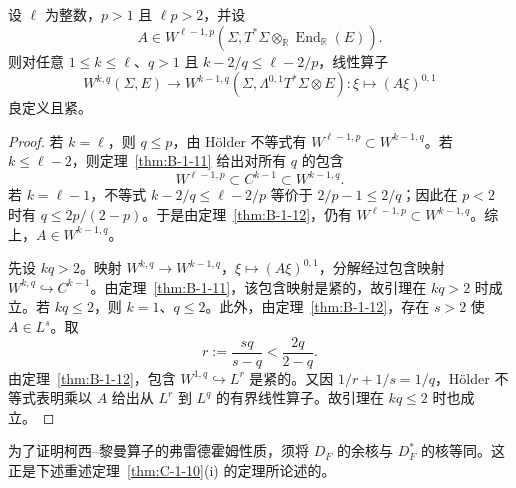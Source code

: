\begin{lemma}\label{lem:C-2-2}
设 $\ell$ 为整数，$p>1$ 且 $\ell p>2$，并设
\[
  A\in W^{\ell-1,p}(\Sigma,T^*\Sigma\otimes_{\mathbb R}\operatorname{End}_{\mathbb R}(E)).
\]
则对任意 $1\le k\le\ell$、$q>1$ 且 $k-2/q\le\ell-2/p$，线性算子
\[
  W^{k,q}(\Sigma,E)\longrightarrow
  W^{k-1,q}(\Sigma,\Lambda^{0,1}T^*\Sigma\otimes E):
  \xi\longmapsto(A\xi)^{0,1}
\]
良定义且紧。
\end{lemma}
\begin{proof}
若 $k=\ell$，则 $q\le p$，由 Hölder 不等式有 $W^{\ell-1,p}\subset W^{k-1,q}$。若 $k\le\ell-2$，则定理~\ref{thm:B-1-11} 给出对所有 $q$ 的包含
\[
  W^{\ell-1,p}\subset C^{k-1}\subset W^{k-1,q}.
\]
若 $k=\ell-1$，不等式 $k-2/q\le\ell-2/p$ 等价于 $2/p-1\le2/q$；因此在 $p<2$ 时有 $q\le2p/(2-p)$。于是由定理~\ref{thm:B-1-12}，仍有 $W^{\ell-1,p}\subset W^{k-1,q}$。综上，$A\in W^{k-1,q}$。

先设 $kq>2$。映射 $W^{k,q}\to W^{k-1,q}$，$\xi\mapsto(A\xi)^{0,1}$，分解经过包含映射 $W^{k,q}\hookrightarrow C^{k-1}$。由定理~\ref{thm:B-1-11}，该包含映射是紧的，故引理在 $kq>2$ 时成立。若 $kq\le2$，则 $k=1$、$q\le2$。此外，由定理~\ref{thm:B-1-12}，存在 $s>2$ 使 $A\in L^s$。取
\[
  r:=\frac{sq}{s-q}<\frac{2q}{2-q}.
\]
由定理~\ref{thm:B-1-12}，包含 $W^{1,q}\hookrightarrow L^r$ 是紧的。又因 $1/r+1/s=1/q$，Hölder 不等式表明乘以 $A$ 给出从 $L^r$ 到 $L^q$ 的有界线性算子。故引理在 $kq\le2$ 时也成立。
\end{proof}

为了证明柯西–黎曼算子的弗雷德霍姆性质，须将 $D_F$ 的余核与 $D_F^*$ 的核等同。这正是下述重述定理~\ref{thm:C-1-10}(i) 的定理所论述的。

